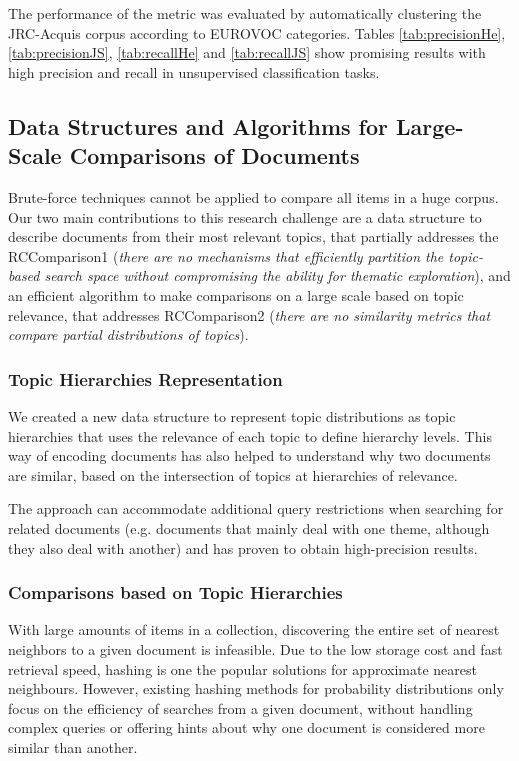 The performance of the metric was evaluated by automatically clustering the JRC-Acquis corpus according to EUROVOC categories. Tables \ref{tab:precisionHe}, \ref{tab:precisionJS}, \ref{tab:recallHe} and \ref{tab:recallJS} show promising results with high precision and recall in unsupervised classification tasks.


\subsection{Data Structures and Algorithms for Large-Scale Comparisons of Documents}

Brute-force techniques cannot be applied to compare all items in a huge corpus. Our two main contributions to this research challenge are a data structure to describe documents from their most relevant topics, that partially addresses the RCComparison1 (\textit{there are no mechanisms that efficiently partition the topic-based search space without compromising the ability for thematic exploration}), and an efficient algorithm to make comparisons on a large scale based on topic relevance, that addresses RCComparison2 (\textit{there are no similarity metrics that compare partial distributions of topics}).

\subsubsection{Topic Hierarchies Representation}

We created a new data structure to represent topic distributions as topic hierarchies that uses the relevance of each topic to define hierarchy levels. This way of encoding documents has also helped to understand why two documents are similar, based on the intersection of topics at hierarchies of relevance.

The approach can accommodate additional query restrictions when searching for related documents (e.g. documents that mainly deal with one theme, although they also deal with another) and has proven to obtain high-precision results. 

\subsubsection{Comparisons based on Topic Hierarchies}

With large amounts of items in a collection, discovering the entire set of nearest neighbors to a given document is infeasible. Due to the low storage cost and fast retrieval speed, hashing is one the popular solutions for approximate nearest neighbours. However, existing hashing methods for probability distributions only focus on the efficiency of searches from a given document, without handling complex queries or offering hints about why one document is considered more similar than another.

